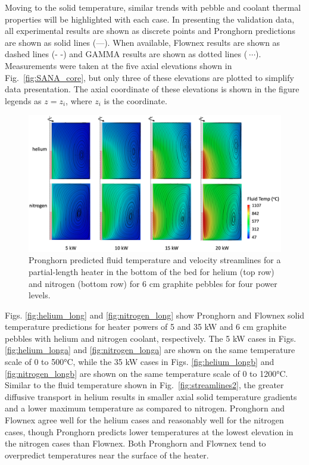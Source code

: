 Moving to the solid temperature, similar trends with pebble and coolant thermal properties will be highlighted with each case. In presenting the validation data, all experimental results are shown as discrete points and Pronghorn predictions are shown as solid lines (---). When available, Flownex results are shown as dashed lines (- -) and GAMMA results are shown as dotted lines ($\ \cdots$). Measurements were taken at the five axial elevations shown in Fig.\ \ref{fig:SANA_core}, but only three of these elevations are plotted to simplify data presentation. The axial coordinate of these elevations is shown in the figure legends as $z=z_i$, where $z_i$ is the coordinate.

\begin{figure}[h!]
\centering
\centerline{
\includegraphics[height=0.6\linewidth]{figs/sana_bottom_vel.png}}
\caption{Pronghorn predicted fluid temperature and velocity streamlines for a partial-length heater in the bottom of the bed for helium (top row) and nitrogen (bottom row) for 6 \si{\centi\meter} graphite pebbles for four power levels.}
\label{fig:streamlines1}
\end{figure}

Figs. \ref{fig:helium_long} and \ref{fig:nitrogen_long} show Pronghorn and Flownex solid temperature predictions for heater powers of 5 and 35 \si{\kilo\watt} and 6 \si{\centi\meter} graphite pebbles with helium and nitrogen coolant, respectively. The 5 \si{\kilo\watt} cases in Figs. \ref{fig:helium_longa} and \ref{fig:nitrogen_longa} are shown on the same temperature scale of 0 to 500\si{\celsius}, while the 35 \si{\kilo\watt} cases in Figs. \ref{fig:helium_longb} and \ref{fig:nitrogen_longb} are shown on the same temperature scale of 0 to 1200\si{\celsius}. Similar to the fluid temperature shown in Fig.\ \ref{fig:streamlines2}, the greater diffusive transport in helium results in smaller axial solid temperature gradients and a lower maximum temperature as compared to nitrogen. Pronghorn and Flownex agree well for the helium cases and reasonably well for the nitrogen cases, though Pronghorn predicts lower temperatures at the lowest elevation in the nitrogen cases than Flownex. Both Pronghorn and Flownex tend to overpredict temperatures near the surface of the heater.

